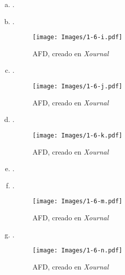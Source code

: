 \begin{mdframed}[style = warning]
\begin{problem}
\begin{enumerate}[a)]
			\item .		
				
				
			
			\item .		
				\begin{figure}[H]
					\centering
					\texttt{[image: Images/1-6-i.pdf]}
					\caption{AFD, creado en \textit{Xournal}}
					\label{1-6-i}
				\end{figure}
				
			\item .		
				\begin{figure}[H]
					\centering
					\texttt{[image: Images/1-6-j.pdf]}
					\caption{AFD, creado en \textit{Xournal}}
					\label{1-6-j}
				\end{figure}
				
				
			\item .		
				\begin{figure}[H]
					\centering
					\texttt{[image: Images/1-6-k.pdf]}
					\caption{AFD, creado en \textit{Xournal}}
					\label{1-6-k}
				\end{figure}
				
			\item .	
			\item .		
				\begin{figure}[H]
					\centering
					\texttt{[image: Images/1-6-m.pdf]}
					\caption{AFD, creado en \textit{Xournal}}
					\label{1-6-m}
				\end{figure}
				
			\item .		
				\begin{figure}[H]
					\centering
					\texttt{[image: Images/1-6-n.pdf]}
					\caption{AFD, creado en \textit{Xournal}}
					\label{1-6-n}
				\end{figure}
		\end{enumerate}
	\end{problem}
\end{mdframed}









